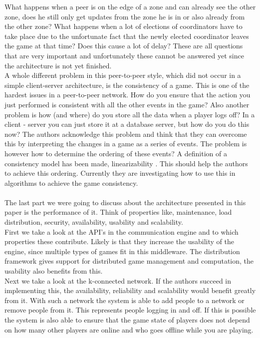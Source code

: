 What happens when a peer is on the edge of a zone and can already see the other zone, does he still only get updates from the zone he is in or also already from the other zone? 
What happens when a lot of elections of coordinators have to take place due to the unfortunate fact that the newly elected coordinator leaves the game at that time? 
Does this cause a lot of delay? 
These are all questions that are very important and unfortunately these cannot be answered yet since the architecture is not yet finished. \\
\indent A whole different problem in this peer-to-peer style, which did not occur in a simple client-server architecture, is the consistency of a game. 
This is one of the hardest issues in a peer-to-peer network. 
How do you ensure that the action you just performed is consistent with all the other events in the game? 
Also another problem is how (and where) do you store all the data when a player logs off? 
In a client - server you can just store it at a database server, but how do you do this now? 
The authors acknowledge this problem and think that they can overcome this by interpreting the changes in a game as a series of events. 
The problem is however how to determine the ordering of these events? 
A definition of a consistency model has been made, linearizability \cite{linear}. 
This should help the authors to achieve this ordering. 
Currently they are investigating how to use this in algorithms to achieve the game consistency.\\
\\
The last part we were going to discuss about the architecture presented in this paper is the performance of it. 
Think of properties like, maintenance, load distribution, security, availability, usability and scalability. \\
\indent First we take a look at the API's in the communication engine and to which properties these contribute. 
Likely is that they increase the usability of the engine, since multiple types of games fit in this middleware. 
The distribution framework gives support for distributed game management and computation, the usability also benefits from this.\\
\indent Next we take a look at the k-connected network. 
If the authors succeed in implementing this, the availability, reliability and scalability would benefit greatly from it. 
With such a network the system is able to add people to a network or remove people from it. 
This represents people logging in and off. 
If this is possible the system is also able to ensure that the game state of players does not depend on how many other players are online and who goes offline while you are playing. 
